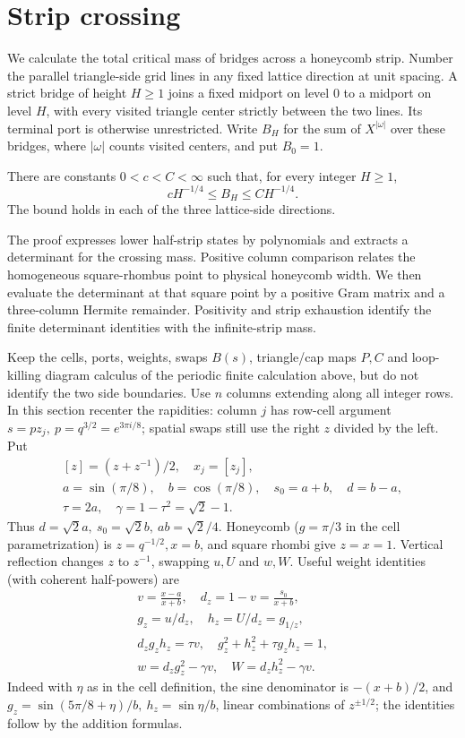 \section{Strip crossing}\label{L:part6}

We calculate the total critical mass of bridges across a honeycomb strip.
Number the parallel triangle-side grid lines in any fixed lattice direction
at unit spacing. A strict bridge of height $H\ge1$ joins a fixed midport on
level $0$ to a midport on level $H$, with every visited triangle center
strictly between the two lines. Its terminal port is otherwise unrestricted.
Write $B_H$ for the sum of $X^{|\omega|}$ over these bridges, where
$|\omega|$ counts visited centers, and put $B_0=1$.

\begin{proposition}\label{L:prop:strip-mass}
There are constants $0<c<C<\infty$ such that, for every integer $H\ge1$,
\[
 cH^{-1/4}\le B_H\le CH^{-1/4}.
\]
The bound holds in each of the three lattice-side directions.
\end{proposition}

The proof expresses lower half-strip states by polynomials and extracts
a determinant for the crossing mass. Positive column comparison relates
the homogeneous square-rhombus point to physical honeycomb width. We then
evaluate the determinant at that square point by a positive Gram matrix
and a three-column Hermite remainder. Positivity and strip exhaustion
identify the finite determinant identities with the infinite-strip mass.

Keep the cells, ports, weights, swaps \(B(s)\), triangle/cap maps \(P,C\) and loop-killing diagram calculus of the periodic finite calculation above, but do not identify the two side boundaries. Use \(n\) columns extending along all integer rows. In this section recenter the rapidities: column \(j\) has row-cell argument \(s=p z_j,\ p=q^{3/2}=e^{3\pi i/8}\); spatial swaps still use the right \(z\) divided by the left. Put
\[
\begin{gathered}
 [z]=(z+z^{-1})/2,\quad x_j=[z_j],\\
 a=\sin(\pi/8),\quad b=\cos(\pi/8),\quad s_0=a+b,\quad d=b-a,\\
 \tau=2a,\quad \gamma=1-\tau^2=\sqrt2-1 .
\end{gathered}
\]
Thus \(d=\sqrt2 a,\ s_0=\sqrt2 b,\ ab=\sqrt2/4\). Honeycomb (\(g=\pi/3\) in the cell parametrization) is \(z=q^{-1/2},x=b\), and square rhombi give \(z=x=1\). Vertical reflection changes \(z\) to \(z^{-1}\), swapping \(u,U\) and \(w,W\). Useful weight identities (with coherent half-powers) are
\[
\begin{gathered}
 v=\frac{x-a}{x+b},\quad d_z=1-v=\frac{s_0}{x+b},\\
 g_z=u/d_z,\quad h_z=U/d_z=g_{1/z},\\
 d_z g_z h_z=\tau v,\quad g_z^2+h_z^2+\tau g_z h_z=1,\\
 w=d_z g_z^2-\gamma v,\quad W=d_z h_z^2-\gamma v .
\end{gathered}
\]
Indeed with \(\eta\) as in the cell definition, the sine denominator is \(-(x+b)/2\), and \(g_z=\sin(5\pi/8+\eta)/b,\ h_z=\sin\eta/b\), linear combinations of \(z^{\pm1/2}\); the identities follow by the addition formulas.

